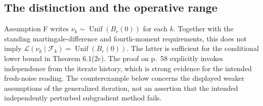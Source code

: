 \documentclass[10pt]{article}
\begin{document}
\subsection*{The distinction and the operative range}
Assumption F writes \(\nu_k\sim\mathop{\mathrm{Unif}}(B_r(0))\) for each \(k\). Together with the standing martingale-difference and fourth-moment requirements, this does not imply \(\mathcal L(\nu_k\mid\mathcal F_k)=\mathop{\mathrm{Unif}}(B_r(0))\). The latter is sufficient for the conditional lower bound in Theorem 6.1(2c). The proof on p. 58 explicitly invokes independence from the iterate history, which is strong evidence for the intended fresh-noise reading. The counterexample below concerns the displayed weaker assumptions of the generalized iteration, not an assertion that the intended independently perturbed subgradient method fails.\par
\end{document}
